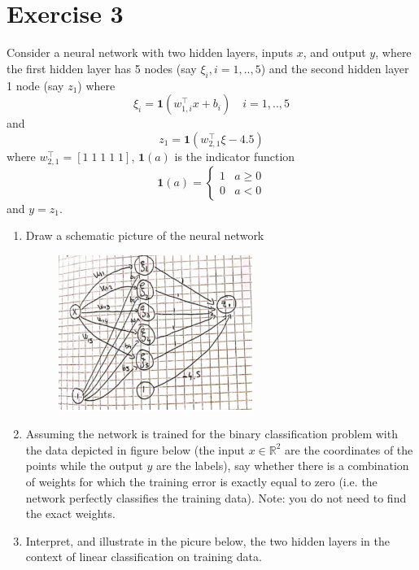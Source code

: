 \documentclass[a4paper,11pt,oneside]{book}
\begin{document}
\section{Exercise 3}
    Consider a neural network with two hidden layers, inputs $x$, and output $y$, where the first hidden layer has 5 nodes (say $\xi_i, i = 1,..,5$) and the second hidden layer 1 node (say $z_1$) where
    $$\xi_i = \mathbf{1}(w_{1,i}^{\top}x + b_i) \quad i = 1,..,5$$
    and
    $$z_1 = \mathbf{1}(w_{2,1}^{\top}\xi - 4.5)$$
    where $w_{2,1}^{\top} = [1\; 1\; 1\; 1\; 1]$, $\mathbf{1}(a)$ is the indicator function
    $$\mathbf{1}(a) = \begin{cases} 1 & a \geq 0 \\ 0 & a < 0 \end{cases}$$
    and $y = z_1$.
    \begin{enumerate}
        \item Draw a schematic picture of the neural network
            \begin{solution}
                \begin{figure}[H]
                    \centering
                    \includegraphics[width=0.6\textwidth,height=0.4\textheight,keepaspectratio]{images/1_3_26_June_2018.png}
                \end{figure}
            \end{solution}
        \item Assuming the network is trained for the binary classification problem with the data depicted in figure below (the input $x \in \mathbb{R}^2$ are the coordinates of the points while the output $y$ are the labels), say whether there is a combination of weights for which the training error is exactly equal to zero (i.e. the network perfectly classifies the training data). Note: you do not need to find the exact weights.
        
        \clearpage
        \item Interpret, and illustrate in the picure below, the two hidden layers in the context of linear classification on training data.
        

\end{enumerate}
\end{document}

